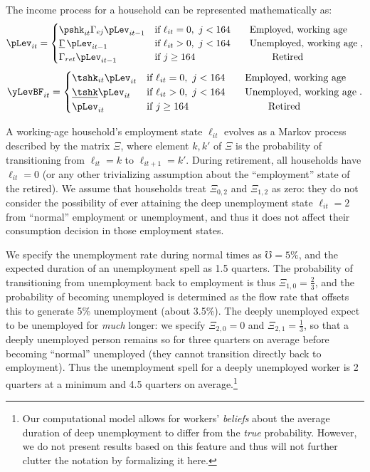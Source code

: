 \documentclass[./ConsumptionResponse]{subfiles}
\begin{document}
The income process for a household can be represented mathematically as:
\begin{equation*}
  \pLev_{it} = \begin{cases}
    \pshk_{it} \Gamma_{ej} \pLev_{it-1} & \text{if } \ell_{it} = 0,~ j < 164 \qquad\text{Employed, working age}\\
    \underline{\Gamma}\, \pLev_{it-1} & \text{if } \ell_{it} > 0,~ j < 164 \qquad\text{Unemployed, working age}\\
    \Gamma_{ret} \pLev_{it-1} & \text{if } j \geq 164 \qquad \qquad \qquad \qquad \text{Retired}
  \end{cases},
\end{equation*}
\begin{equation*}
  \yLevBF_{it} = \begin{cases}
    \tshk_{it} \pLev_{it} & \text{if } \ell_{it} = 0,~ j < 164 \qquad\text{Employed, working age}\\
    \underline{\tshk} \pLev_{it} & \text{if } \ell_{it} > 0,~ j < 164 \qquad\text{Unemployed, working age}\\
    \pLev_{it} & \text{if } j \geq 164 \qquad \qquad \qquad \qquad \text{Retired}
  \end{cases}.
\end{equation*}

A working-age household's employment state $\ell_{it}$ evolves as a Markov process described by the matrix $\Xi$, where element $k,k'$ of $\Xi$ is the probability of transitioning from $\ell_{it} = k$ to $\ell_{it+1} = k'$.  During retirement, all households have $\ell_{it}=0$ (or any other trivializing assumption about the ``employment'' state of the retired).
We assume that households treat $\Xi_{0,2}$ and $\Xi_{1,2}$ as zero: they do not consider the possibility of ever attaining the deep unemployment state $\ell_{it}=2$ from ``normal'' employment or unemployment, and thus it does not affect their consumption decision in those employment states.

We specify the unemployment rate during normal times as $\mho = 5\%$, and the expected duration of an unemployment spell as 1.5 quarters.
The probability of transitioning from unemployment back to employment is thus $\Xi_{1,0} = \frac{2}{3}$, and the probability of becoming unemployed is determined as the flow rate that offsets this to generate 5\% unemployment (about 3.5\%).
The deeply unemployed expect to be unemployed for \textit{much} longer: we specify $\Xi_{2,0} = 0$ and $\Xi_{2,1} = \frac{1}{3}$, so that a deeply unemployed person remains so for three quarters on average before becoming ``normal'' unemployed (they cannot transition directly back to employment).
Thus the unemployment spell for a deeply unemployed worker is 2 quarters at a minimum and 4.5 quarters on average.\footnote{Our computational model allows for workers' \textit{beliefs} about the average duration of deep unemployment to differ from the \textit{true} probability.  However, we do not present results based on this feature and thus will not further clutter the notation by formalizing it here.}
\end{document}

